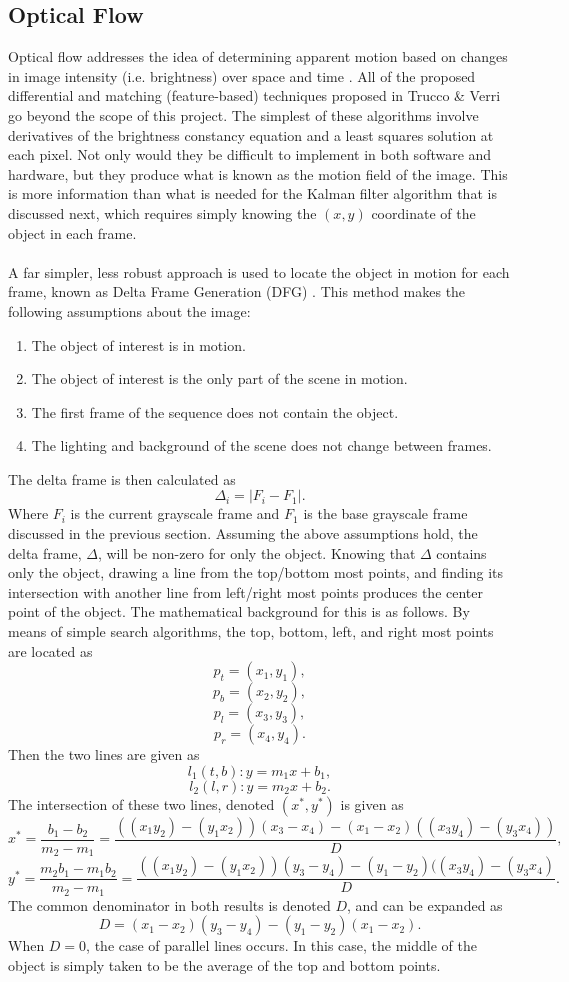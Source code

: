 \documentclass[12pt]{article} %
\begin{document}
\subsection{Optical Flow}
\label{sec:of}
Optical flow addresses the idea of determining apparent motion based on changes in image intensity (i.e. brightness) over space and time \cite{4}. All of the proposed differential and matching (feature-based) techniques proposed in Trucco \& Verri \cite{4} go beyond the scope of this project. The simplest of these algorithms involve derivatives of the brightness constancy equation and a least squares solution at each pixel. Not only would they be difficult to implement in both software and hardware, but they produce what is known as the motion field of the image. This is more information than what is needed for the Kalman filter algorithm that is discussed next, which requires simply knowing the $(x,y)$ coordinate of the object in each frame. \\\\
A far simpler, less robust approach is used to locate the object in motion for each frame, known as Delta Frame Generation (DFG) \cite{8}. This method makes the following assumptions about the image:
\begin{enumerate}
\item The object of interest is in motion.
\item The object of interest is the only part of the scene in motion.
\item The first frame of the sequence does not contain the object.
\item The lighting and background of the scene does not change between frames.
\end{enumerate}
The delta frame is then calculated as 
\begin{equation}
\Delta_i = | F_i - F_1 |.
\end{equation}
Where $F_i$ is the current grayscale frame and $F_1$ is the base grayscale frame discussed in the previous section. Assuming the above assumptions hold, the delta frame, $\Delta$, will be non-zero for only the object. Knowing that $\Delta$ contains only the object, drawing a line from the top/bottom most points, and finding its intersection with another line from left/right most points produces the center point of the object. The mathematical background for this is as follows. By means of simple search algorithms, the top, bottom, left, and right most points are located as
\[
p_t = (x_1, y_1) ,
\]
\[
p_b = (x_2, y_2) ,
\]
\[
p_l = (x_3, y_3) ,
\]
\[
p_r = (x_4, y_4) .
\]
Then the two lines are given as 
\[
l_1(t,b): y = m_1 x + b_1,
\]
\[
l_2(l,r): y = m_2 x + b_2.
\]
The intersection of these two lines, denoted $(x^*, y^*)$ is given as
\[
x^* = \frac{b_1 - b_2}{m_2 - m_1} = \frac{((x_1y_2) - (y_1x_2))(x_3 - x_4) - (x_1 - x_2)((x_3y_4) - (y_3x_4))}{D},
\]
\[
y^*  = \frac{m_2 b_1 - m_1 b_2}{m_2 - m_1} = \frac{((x_1y_2) - (y_1x_2))(y_3 - y_4) - (y_1 - y_2)((x_3y_4) - (y_3x_4)}{D}.
\]
The common denominator in both results is denoted $D$, and can be expanded as
\[
D = (x_1 - x_2)(y_3 - y_4) - (y_1 - y_2)(x_1 - x_2).
\]
When $D = 0$, the case of parallel lines occurs. In this case, the middle of the object is simply taken to be the average of the top and bottom points.
\end{document}

